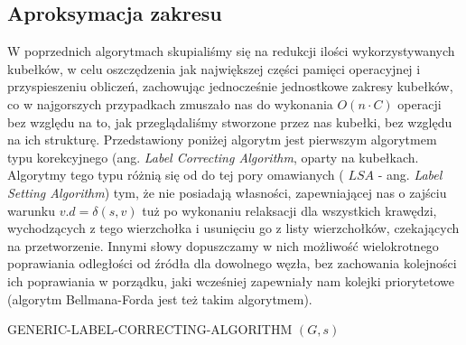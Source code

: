 \subsection{Aproksymacja zakresu}

W poprzednich algorytmach skupialiśmy się na redukcji ilości wykorzystywanych kubełków, w celu oszczędzenia jak największej części pamięci operacyjnej i przyspieszeniu obliczeń, zachowując jednocześnie jednostkowe zakresy kubełków, co w najgorszych przypadkach zmuszało nas do wykonania $O \left( n \cdot C \right)$ operacji bez względu na to, jak przeglądaliśmy stworzone przez nas kubełki, bez względu na ich strukturę. Przedstawiony poniżej algorytm jest pierwszym algorytmem typu korekcyjnego (ang. \textit{Label Correcting Algorithm}, oparty na kubełkach. Algorytmy tego typu różnią się od do tej pory omawianych ( $LSA$ - ang. \textit{Label Setting Algorithm}) tym, że nie posiadają własności, zapewniającej nas o zajściu warunku $v.d = \delta \left( s, v \right)$ tuż po wykonaniu relaksacji dla wszystkich krawędzi, wychodzących z tego wierzchołka i usunięciu go z listy wierzchołków, czekających na przetworzenie. Innymi słowy dopuszczamy w nich możliwość wielokrotnego poprawiania odległości od źródła dla dowolnego węzła, bez zachowania kolejności ich poprawiania w porządku, jaki wcześniej zapewniały nam kolejki priorytetowe (algorytm Bellmana-Forda jest też takim algorytmem). 

\begin{algorithm}[!htbp]
\DontPrintSemicolon
{}
\caption{ GENERIC-LABEL-CORRECTING-ALGORITHM $\left( G, s \right)$\label{alg:GenericLabelCorrectingAlgorithm}}
\end{algorithm}

